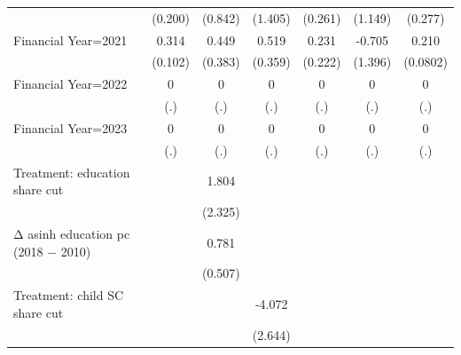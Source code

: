 \begin{table}[htbp]
\begin{tabular}{l*{6}{c}}
                    &     (0.200)         &     (0.842)         &     (1.405)         &     (0.261)         &     (1.149)         &     (0.277)         \\
\addlinespace
Financial Year=2021 &       0.314\sym{***}&       0.449         &       0.519         &       0.231         &      -0.705         &       0.210\sym{***}\\
                    &     (0.102)         &     (0.383)         &     (0.359)         &     (0.222)         &     (1.396)         &    (0.0802)         \\
\addlinespace
Financial Year=2022 &           0         &           0         &           0         &           0         &           0         &           0         \\
                    &         (.)         &         (.)         &         (.)         &         (.)         &         (.)         &         (.)         \\
\addlinespace
Financial Year=2023 &           0         &           0         &           0         &           0         &           0         &           0         \\
                    &         (.)         &         (.)         &         (.)         &         (.)         &         (.)         &         (.)         \\
\addlinespace
Treatment: education share cut&                     &       1.804         &                     &                     &                     &                     \\
                    &                     &     (2.325)         &                     &                     &                     &                     \\
\addlinespace
Δ asinh education pc (2018 − 2010)&                     &       0.781         &                     &                     &                     &                     \\
                    &                     &     (0.507)         &                     &                     &                     &                     \\
\addlinespace
Treatment: child SC share cut&                     &                     &      -4.072         &                     &                     &                     \\
                    &                     &                     &     (2.644)         &                     &                     &                     \\

\end{tabular}
\end{table}
